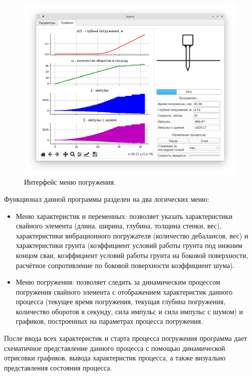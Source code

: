 \begin{figure}[h]
    \centering
    \includegraphics[width=1\linewidth]{img/xolm_3_linux_graps.png}
    \caption{Интерфейс меню погружения.}
    \label{fig:xolm_3_graps}
\end{figure}

Функционал данной программы разделен на два логических меню:
\begin{itemize}
    \item Меню характеристик и переменных:
    позволяет указать характеристики свайного элемента (длина, ширина, глубина, толщина стенки, вес),
    характеристики вибрационного погружателя (количество дебалансов, вес) и характеристики грунта
    (коэффициент условий работы грунта под нижним концом сваи, коэффициент условий работы грунта на боковой поверхности,
    расчётное сопротивление по боковой поверхности коэффициент шума).
    \item Меню погружения:
    позволяет следить за динамическим процессом погружения свайного элемента с отображением характеристик данного процесса
    (текущее время погружения, текущая глубина погружения, количество оборотов в секунду, сила импульс и сила импульс с шумом)
    и графиков, построенных на параметрах процесса погружения.
\end{itemize}

После ввода всех характеристик и старта процесса погружения программа дает схематичное представление данного процесса с помощью динамической отрисовки графиков,
вывода характеристик процесса, а также визуально представления состояния процесса.

